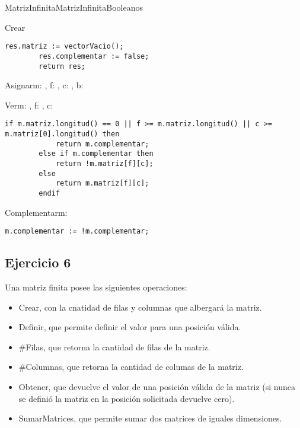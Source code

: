\begin{module}{MatrizInfinita}{}{MatrizInfinitaBooleanos}{}

	\begin{proc}{Crear}{}{\moduletype}
		\begin{lstlisting}[numbers=none,frame=none]
		res.matriz := vectorVacio();
		res.complementar := false;
		return res;
		\end{lstlisting}
	\end{proc}

	\begin{proc}{Asignar}{\Inout m: \moduletype, \In f: \Int, \In c: \Int, \In b: \bool}{}
		\hacer
	\end{proc}

	\begin{proc}{Ver}{\In m: \moduletype, \In f: \Int, \In c: \Int}{\bool}
		\begin{lstlisting}[numbers=none,frame=none]
		if m.matriz.longitud() == 0 || f >= m.matriz.longitud() || c >= m.matriz[0].longitud() then
			return m.complementar;
		else if m.complementar then
			return !m.matriz[f][c];
		else
			return m.matriz[f][c];
		endif
		\end{lstlisting}
	\end{proc}

	\begin{proc}{Complementar}{\Inout m: \moduletype}{}
		\begin{lstlisting}[numbers=none,frame=none]
		m.complementar := !m.complementar;
		\end{lstlisting}
	\end{proc}
\end{module}

\subsection{Ejercicio 6}
Una matriz finita posee las siguientes operaciones:
\begin{itemize}
	\item Crear, con la cnatidad de filas y columnas que albergará la matriz.
	\item Definir, que permite definir el valor para una posición válida.
	\item \#Filas, que retorna la cantidad de filas de la matriz.
	\item \#Columnas, que retorna la cantidad de columas de la matriz.
	\item Obtener, que devuelve el valor de una posición válida de la matriz (si nunca se definió la matriz en la posición solicitada devuelve cero).
	\item SumarMatrices, que permite sumar dos matrices de iguales dimensiones.
\end{itemize}

